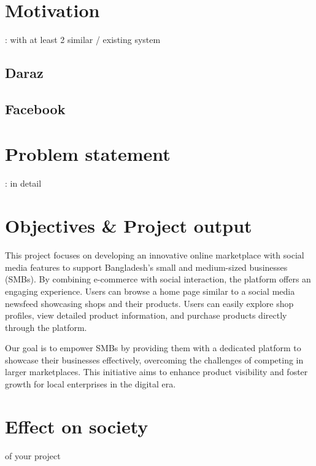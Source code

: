 \documentclass[10pt,a4paper]{extarticle}
\begin{document}
\setcounter{page}{2}

\tableofcontents

\pagebreak
{}

\section{Motivation}: with at least 2 similar / existing system 

\subsection{Daraz}

\subsection{Facebook}



\section{Problem statement} : in detail 


\section{Objectives \& Project output}
This project focuses on developing an innovative online marketplace with social media features to support Bangladesh's small and medium-sized businesses (SMBs). By combining e-commerce with social interaction, the platform offers an engaging experience. Users can browse a home page similar to a social media newsfeed showcasing shops and their products. Users can easily explore shop profiles, view detailed product information, and purchase products directly through the platform.

Our goal is to empower SMBs by providing them with a dedicated platform to showcase their businesses effectively, overcoming the challenges of competing in larger marketplaces. This initiative aims to enhance product visibility and foster growth for local enterprises in the digital era.




\section{Effect on society} of your project 
\end{document}

